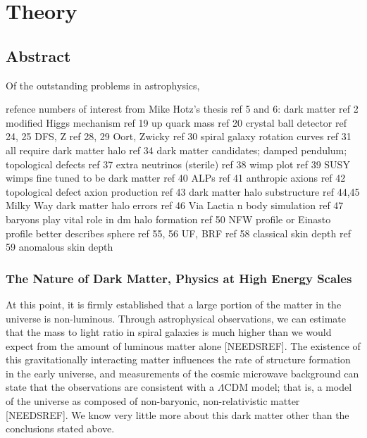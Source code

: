 \documentclass[12pt, twoside]{book}
\begin{document}
\tableofcontents

\chapter{Theory}
\section{Abstract}

Of the outstanding problems in astrophysics, 

refence numbers of interest from Mike Hotz's thesis
ref 5 and 6: dark matter
ref 2 modified Higgs mechanism
ref 19 up quark mass
ref 20 crystal ball detector
ref 24, 25 DFS, Z
ref 28, 29 Oort, Zwicky
ref 30 spiral galaxy rotation curves
ref 31 all require dark matter halo
ref 34 dark matter candidates; damped pendulum; topological defects
ref 37 extra neutrinos (sterile)
ref 38 wimp plot
ref 39 SUSY wimps fine tuned to be dark matter
ref 40 ALPs
ref 41 anthropic axions
ref 42 topological defect axion production
ref 43 dark matter halo substructure
ref 44,45 Milky Way dark matter halo errors
ref 46 Via Lactia n body simulation
ref 47 baryons play vital role in dm halo formation
ref 50 NFW profile or Einasto profile better describes sphere
ref 55, 56 UF, BRF
ref 58 classical skin depth
ref 59 anomalous skin depth

\subsection{The Nature of Dark Matter, Physics at High Energy Scales}

At this point, it is firmly established that a large portion of the matter in the universe is non-luminous. Through astrophysical observations, we can estimate that the mass to light ratio in spiral galaxies is much higher than we would expect from the amount of luminous matter alone [NEEDSREF]. The existence of this gravitationally interacting matter influences the rate of structure formation in the early universe, and measurements of the cosmic microwave background can state that the observations are consistent with a $\Lambda$CDM model; that is, a model of the universe as composed of non-baryonic, non-relativistic matter [NEEDSREF]. We know very little more about this dark matter other than the conclusions stated above.
\end{document}
